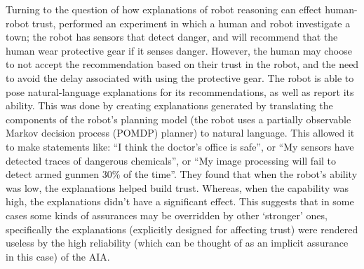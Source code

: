 Turning to the question of how explanations of robot reasoning can effect human-robot trust, \citet{Wang2016-id} performed an experiment in which a human and robot investigate a town; the robot has sensors that detect danger, and will recommend that the human wear protective gear if it senses danger. However, the human may choose to not accept the recommendation based on their trust in the robot, and the need to avoid the delay associated with using the protective gear. The robot is able to pose natural-language explanations for its recommendations, as well as report its ability. This was done by creating explanations generated by translating the components of the robot's planning model (the robot uses a partially observable Markov decision process (POMDP) planner) to natural language. This allowed it to make statements like: ``I think the doctor's office is safe'', or ``My sensors have detected traces of dangerous chemicals'', or ``My image processing will fail to detect armed gunmen 30\% of the time''. They found that when the robot's ability was low, the explanations helped build trust. Whereas, when the capability was high, the explanations didn't have a significant effect. This suggests that in some cases some kinds of assurances may be overridden by other `stronger' ones, specifically the explanations (explicitly designed for affecting trust) were rendered useless by the high reliability (which can be thought of as an implicit assurance in this case) of the AIA. 

